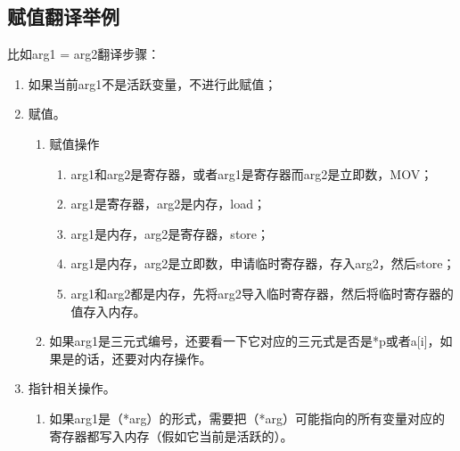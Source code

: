 \documentclass[12pt,a4paper,Flow]{report}
\begin{document}
\subsection{赋值翻译举例}
比如arg1 = arg2翻译步骤：
\begin{enumerate}
\item 如果当前arg1不是活跃变量，不进行此赋值；
\item 赋值。
\begin{enumerate}
\item 赋值操作
\begin{enumerate}
\item arg1和arg2是寄存器，或者arg1是寄存器而arg2是立即数，MOV；
\item arg1是寄存器，arg2是内存，load；
\item arg1是内存，arg2是寄存器，store；
\item arg1是内存，arg2是立即数，申请临时寄存器，存入arg2，然后store；
\item arg1和arg2都是内存，先将arg2导入临时寄存器，然后将临时寄存器的值存入内存。
\end{enumerate}
\item 如果arg1是三元式编号，还要看一下它对应的三元式是否是*p或者a[i]，如果是的话，还要对内存操作。
\end{enumerate}
\item 指针相关操作。
\begin{enumerate}
\item 如果arg1是（*arg）的形式，需要把（*arg）可能指向的所有变量对应的寄存器都写入内存（假如它当前是活跃的）。
\end{enumerate}
\end{enumerate}
\end{document}

